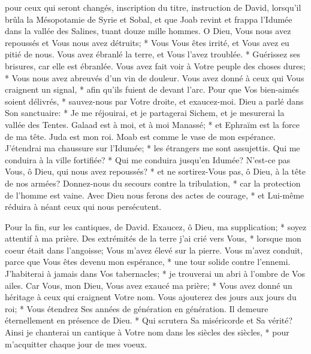 pour ceux qui seront changés, inscription du titre, instruction de David,
lorsqu'il brûla la Mésopotamie de Syrie et Sobal, et que Joab revint et frappa l'Idumée dans la vallée des Salines, tuant douze mille hommes.
O Dieu, Vous nous avez repoussés et Vous nous avez détruits; * Vous Vous êtes irrité, et Vous avez eu pitié de nous.
Vous avez ébranlé la terre, et Vous l'avez troublée. * Guérissez ses brisures, car elle est ébranlée.
Vous avez fait voir à Votre peuple des choses dures; * Vous nous avez abreuvés d'un vin de douleur.
Vous avez donné à ceux qui Vous craignent un signal, * afin qu'ils fuient de devant l'arc. Pour que Vos bien-aimés soient délivrés, *
sauvez-nous par Votre droite, et exaucez-moi.
Dieu a parlé dans Son sanctuaire: * Je me réjouirai, et je partagerai Sichem, et je mesurerai la vallée des Tentes.
Galaad est à moi, et à moi Manassé; * et Ephraïm est la force de ma tête. Juda est mon roi.
Moab est comme le vase de mon espérance. J'étendrai ma chaussure sur l'Idumée; * les étrangers me sont assujettis.
Qui me conduira à la ville fortifiée? * Qui me conduira jusqu'en Idumée?
N'est-ce pas Vous, ô Dieu, qui nous avez repoussés? * et ne sortirez-Vous pas, ô Dieu, à la tête de nos armées?
Donnez-nous du secours contre la tribulation, * car la protection de l'homme est vaine.
Avec Dieu nous ferons des actes de courage, * et Lui-même réduira à néant ceux qui nous persécutent.

Pour la fin, sur les cantiques, de David.
Exaucez, ô Dieu, ma supplication; * soyez attentif à ma prière.
Des extrémités de la terre j'ai crié vers Vous, * lorsque mon coeur était dans l'angoisse; Vous m'avez élevé sur la pierre. Vous m'avez conduit,
parce que Vous êtes devenu mon espérance, * une tour solide contre l'ennemi.
J'habiterai à jamais dans Vos tabernacles; * je trouverai un abri à l'ombre de Vos ailes.
Car Vous, mon Dieu, Vous avez exaucé ma prière; * Vous avez donné un héritage à ceux qui craignent Votre nom.
Vous ajouterez des jours aux jours du roi; * Vous étendrez Ses années de génération en génération.
Il demeure éternellement en présence de Dieu. * Qui scrutera Sa miséricorde et Sa vérité?
Ainsi je chanterai un cantique à Votre nom dans les siècles des siècles, * pour m'acquitter chaque jour de mes voeux.

